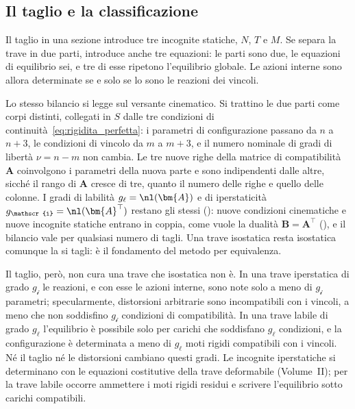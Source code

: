 \subsection{Il taglio e la classificazione}
\label{sec:invarianza_classificazione}

Il taglio in una sezione introduce tre incognite
statiche, $N$, $T$ e $M$. Se separa la trave in due
parti, introduce anche tre equazioni: le parti sono due,
le equazioni di equilibrio sei, e tre di esse ripetono
l'equilibrio globale. Le azioni interne sono allora
determinate se e solo se lo sono le reazioni dei vincoli.

Lo stesso bilancio si legge sul versante cinematico. Si
trattino le due parti come corpi distinti, collegati in
$S$ dalle tre condizioni di
continuità~\eqref{eq:rigidita_perfetta}: i parametri di
configurazione passano da $n$ a $n + 3$, le condizioni di
vincolo da $m$ a $m + 3$, e il numero nominale di gradi
di libertà $\nu = n - m$ non cambia. Le tre nuove righe
della matrice di compatibilità $\bm{A}$ coinvolgono i
parametri della nuova parte e sono indipendenti dalle
altre, sicché il rango di $\bm{A}$ cresce di tre, quanto
il numero delle righe e quello delle colonne. I gradi di
labilità $g_\ell = \nl(\bm{A})$ e di iperstaticità
$g_{\mathscr{i}} = \nl(\bm{A}^{\top})$ restano gli
stessi (): nuove
condizioni cinematiche e nuove incognite statiche
entrano in coppia, come vuole la dualità
$\bm{B} = \bm{A}^{\top}$ (), e il
bilancio vale per qualsiasi numero di tagli. Una trave
isostatica resta isostatica comunque la si tagli: è il
fondamento del metodo per equivalenza.

Il taglio, però, non cura una trave che isostatica non
è. In una trave iperstatica di grado $g_{\mathscr{i}}$
le reazioni, e con esse le azioni interne, sono note solo
a meno di $g_{\mathscr{i}}$ parametri; specularmente,
distorsioni arbitrarie sono incompatibili con i vincoli,
a meno che non soddisfino $g_{\mathscr{i}}$ condizioni di
compatibilità. In una trave labile di grado $g_\ell$
l'equilibrio è possibile solo per carichi che soddisfano
$g_\ell$ condizioni, e la configurazione è determinata
a meno di $g_\ell$ moti rigidi compatibili con i vincoli.
Né il taglio né le distorsioni cambiano questi gradi.
Le incognite iperstatiche si determinano con le equazioni
costitutive della trave deformabile (Volume~II); per la
trave labile occorre ammettere i moti rigidi residui e
scrivere l'equilibrio sotto carichi compatibili.

